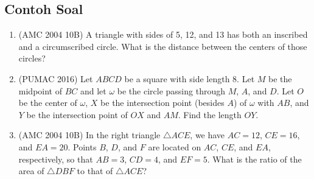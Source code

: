 \documentclass[11pt]{scrartcl}
\begin{document}
\subsection{Contoh Soal}
\begin{enumerate}
    \item (AMC 2004 10B) A triangle with sides of 5, 12, and 13 has both an inscribed and a circumscribed circle. What is the distance between the centers of those circles?
    
    \item (PUMAC 2016) Let $ABCD$ be a square with side length 8. Let $M$ be the midpoint of $BC$ and let $\omega$ be the circle passing through $M$, $A$, and $D$. Let $O$ be the center of $\omega$, $X$ be the intersection point (besides $A$) of $\omega$ with $AB$, and $Y$ be the intersection point of $OX$ and $AM$. Find the length $OY$.

    \item (AMC 2004 10B) In the right triangle $\triangle ACE$, we have $AC = 12$, $CE = 16$, and $EA = 20$. Points $B$, $D$, and $F$ are located on $AC$, $CE$, and $EA$, respectively, so that $AB = 3$, $CD = 4$, and $EF = 5$. What is the ratio of the area of $\triangle DBF$ to that of $\triangle ACE$?
\end{enumerate}
\end{document}
